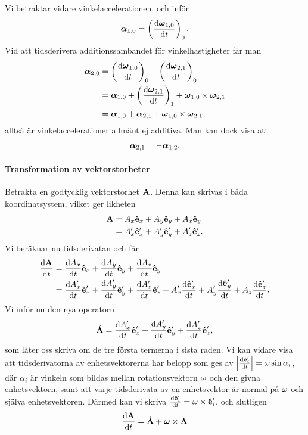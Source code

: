Vi betraktar vidare vinkelaccelerationen, och inför
\begin{align*}
	\vb*{\alpha}_{1, 0} = \left(\dv{\vb*{\omega}_{1, 0}}{t}\right)_{0}.
\end{align*}
Vid att tidsderivera additionssambandet för vinkelhastigheter får man
\begin{align*}
	\vb*{\alpha}_{2, 0} &= \left(\dv{\vb*{\omega}_{1, 0}}{t}\right)_{0} + \left(\dv{\vb*{\omega}_{2, 1}}{t}\right)_{0} \\
	                    &= \vb*{\alpha}_{1, 0} + \left(\dv{\vb*{\omega}_{2, 1}}{t}\right)_{1} + \vb*{\omega}_{1, 0}\times\vb*{\omega}_{2, 1} \\
	                    &= \vb*{\alpha}_{1, 0} + \vb*{\alpha}_{2, 1} + \vb*{\omega}_{1, 0}\times\vb*{\omega}_{2, 1},
\end{align*}
alltså är vinkelaccelerationer allmänt ej additiva. Man kan dock visa att
\begin{align*}
	\vb*{\alpha}_{2, 1} =- \vb*{\alpha}_{1, 2}.
\end{align*}

\paragraph{Transformation av vektorstorheter}
Betrakta en godtycklig vektorstorhet $\vb{A}$. Denna kan skrivas i båda koordinatsystem, vilket ger likheten
\begin{align*}
	\vb{A} &= A_{x}\vu{e}_{x} + A_{y}\vu{e}_{y} + A_{x}\vu{e}_{y} \\
	       &= A_{x}'\vu{e}_{x}' + A_{y}'\vu{e}_{y}' + A_{z}'\vu{e}_{z}'.
\end{align*}
Vi beräknar nu tidsderivatan och får
\begin{align*}
	\dv{\vb{A}}{t} &= \dv{A_{x}}{t}\vu{e}_{x} + \dv{A_{y}}{t}\vu{e}_{y} + \dv{A_{z}}{t}\vu{e}_{y} \\
	       &= \dv{A_{x}'}{t}\vu{e}_{x}' + \dv{A_{y}'}{t}\vu{e}_{y}' + \dv{A_{z}'}{t}\vu{e}_{z}' + A_{x}'\dv{\vu{e}_{x}'}{t} + A_{y}'\dv{\vu{e}_{y}'}{t} + A_{z}\dv{\vu{e}_{z}'}{t}.
\end{align*}
Vi inför nu den nya operatorn
\begin{align*}
	\mathring{\vb{A}} = \dv{A_{x}'}{t}\vu{e}_{x}' + \dv{A_{y}'}{t}\vu{e}_{y}' + \dv{A_{z}'}{t}\vu{e}_{z}',
\end{align*}
som låter oss skriva om de tre första termerna i sista raden. Vi kan vidare visa att tidsderivatorna av enhetsvektorerna har belopp som ges av $\abs{\dv{\vu{e}_{i}'}{t}} = \omega\sin{\alpha_i}$, där $\alpha_i$ är vinkeln som bildas mellan rotationsvektorn $\vb{\omega}$ och den givna enhetsvektorn, samt att varje tidsderivata av en enhetsvektor är normal på $\vb{\omega}$ och själva enhetsvektoren. Därmed kan vi skriva $\dv{\vu{e}_{i}'}{t} = \vb{\omega}\times\vu{e}_{i}'$, och slutligen
\begin{align}
	\dv{\vb{A}}{t} = \mathring{\vb{A}} + \vb*{\omega}\times\vb{A}
	\label{eq:relderiv}
\end{align}

